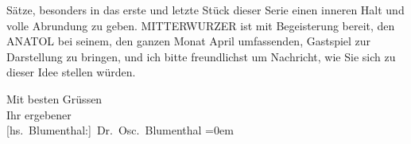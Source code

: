                Sätze, besonders in das erste und letzte Stück dieser Serie einen inneren Halt und
               volle Abrundung zu geben. MITTERWURZER ist mit Begeisterung bereit, den ANATOL bei seinem, den ganzen Monat April umfassenden, Gastspiel zur
               Darstellung zu bringen, und ich bitte freundlichst um Nachricht, wie Sie sich zu
               dieser Idee stellen würden.\pend
           
\pstart
           Mit besten Grüssen{\\[\baselineskip]} Ihr ergebener{\\[\baselineskip]}\spacefill\mbox{{[}hs. Blumenthal:{]} Dr. Osc. Blumenthal}\pend
           \leftskip=0em{}\endnumbering{}  \newcommand{\dateiname}{L00622}\newcommand{\titel}{Oscar Blumenthal an Arthur Schnitzler, 14. 11. 1896}\newcommand{\editorInnen}{Martin Anton Müller und Gerd-Hermann Susen}
